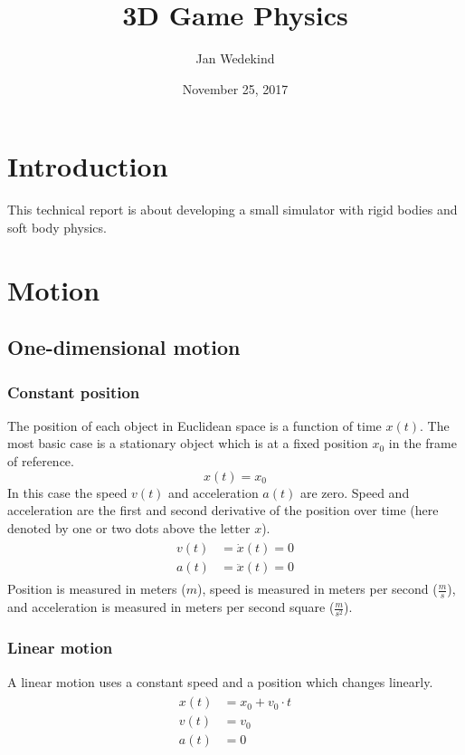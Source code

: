 \documentclass[10pt,a4paper,twoside]{article}
\title{3D Game Physics}
\author{Jan Wedekind}
\date{November 25, 2017}
\begin{document}
\maketitle

\section{Introduction}
This technical report is about developing a small simulator with rigid bodies and soft body physics.

\section{Motion}
\subsection{One-dimensional motion}
\subsubsection{Constant position}
The position of each object in Euclidean space is a function of time $x(t)$.
The most basic case is a stationary object which is at a fixed position $x_0$ in the frame of reference.
\begin{equation*}
  x(t) = x_0
\end{equation*}
In this case the speed $v(t)$ and acceleration $a(t)$ are zero.
Speed and acceleration are the first and second derivative of the position over time (here denoted by one or two dots above the letter $x$).
\begin{align*}
  \begin{split}
    v(t) & = \dot{x}(t)  = 0\\
    a(t) & = \ddot{x}(t) = 0
  \end{split}
\end{align*}
Position is measured in meters ($m$), speed is measured in meters per second ($\frac{m}{s}$), and acceleration is measured in meters per second square ($\frac{m}{s^2}$).

\subsubsection{Linear motion}
A linear motion uses a constant speed and a position which changes linearly.
\begin{align*}
  \begin{split}
    x(t) & = x_0 + v_0 \cdot t\\
    v(t) & = v_0\\
    a(t) & = 0
  \end{split}
\end{align*}
\end{document}
